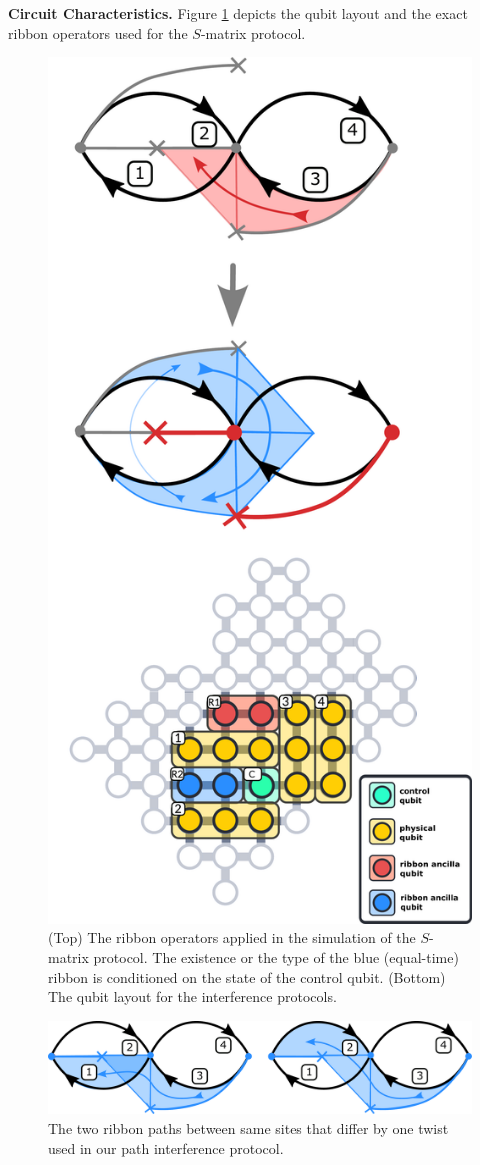 \documentclass[two column]{article}
\begin{document}
\textbf{Circuit Characteristics.}
Figure \ref{fig:intef_setup} depicts the qubit layout and the exact ribbon operators used for the $S$-matrix protocol.
\begin{figure}
	\centering
	\includegraphics[width=0.75\linewidth]{Figures/intef_setup_new.pdf}
	\caption{(Top) The ribbon operators applied in the simulation of the $S$-matrix protocol. The existence or the type of the blue (equal-time) ribbon is conditioned on the state of the control qubit. (Bottom) The qubit layout for the interference protocols.}
	\label{fig:intef_setup}
\end{figure}
\begin{figure}
	\centering
	\includegraphics[width=\linewidth]{Figures/t-mat_ribs.pdf}
	\caption{The two ribbon paths between same sites that differ by one twist used in our path interference protocol.}
	\label{fig:T_intef_setup}
\end{figure}
\end{document}
